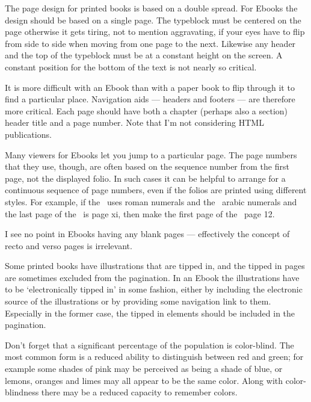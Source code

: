 \documentclass[10pt,a4paper,oneside,extrafontsizes]{memoir}%
\begin{document}
\begin{paracol}{2}
    The page design for printed books is based on a double spread. For
Ebooks the design should be based on a single page. The 
typeblock must be centered on the page otherwise it gets 
tiring, not to mention aggravating, if your eyes have to 
flip from side to side when moving from one page to the next. Likewise
any header and the top of the typeblock 
must be at a constant height on the screen. A constant position for the 
bottom of the text is not nearly so critical.

    It is more difficult with an Ebook than with a paper book 
to flip through it to find a particular place. 
Navigation aids --- headers and footers ---
are therefore more critical. Each page should have both a chapter 
(perhaps also a section) header title and a page number. 
Note that I'm not considering HTML publications.

    Many viewers for Ebooks let you jump to a particular page. The page
numbers that they use, though, are often based on the sequence number from
the first page, not the displayed folio. In such cases it 
can be helpful to arrange for a continuous sequence of page numbers, 
even if the folios are printed using different styles. 
For example, if the \pixfrontmatter\ uses roman numerals and the 
\pixmainmatter\ arabic numerals and the last page of the
\pixfrontmatter\ is page xi, then make the first page of the \pixmainmatter\ 
page 12.

    I see no point in Ebooks having any blank pages --- effectively the
concept of recto and verso pages is irrelevant.

    Some printed books have illustrations that are 
tipped in, and the tipped in pages are sometimes excluded from the 
pagination. In an Ebook the illustrations\index{illustration} have to 
be `electronically tipped in' in some fashion, either
by including the electronic source of the illustrations 
or by providing some navigation link to them. Especially in the former case, 
the tipped in elements should be included in the pagination.

    Don't forget that a significant percentage of the population is 
color-blind.\index{color|(}\index{color!blind} 
The most common form is a reduced ability to distinguish
between red and green; for example some shades of pink may be perceived
as being a shade of blue, or lemons, oranges and limes may all appear to
be the same color. Along with color-blindness there may be a reduced
capacity to remember colors.


\end{paracol}
\end{document}
